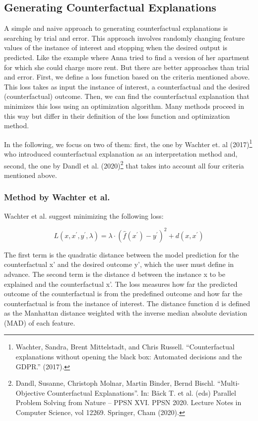 \documentclass[12pt,]{krantz}
\begin{document}
\subsection{Generating Counterfactual
Explanations}\label{generating-counterfactual-explanations}

A simple and naive approach to generating counterfactual explanations is
searching by trial and error. This approach involves randomly changing
feature values of the instance of interest and stopping when the desired
output is predicted. Like the example where Anna tried to find a version
of her apartment for which she could charge more rent. But there are
better approaches than trial and error. First, we define a loss function
based on the criteria mentioned above. This loss takes as input the
instance of interest, a counterfactual and the desired (counterfactual)
outcome. Then, we can find the counterfactual explanation that minimizes
this loss using an optimization algorithm. Many methods proceed in this
way but differ in their definition of the loss function and optimization
method.

In the following, we focus on two of them: first, the one by Wachter et.
al (2017)\footnote{Wachter, Sandra, Brent Mittelstadt, and Chris
  Russell. ``Counterfactual explanations without opening the black box:
  Automated decisions and the GDPR.'' (2017).} who introduced
counterfactual explanation as an interpretation method and, second, the
one by Dandl et al. (2020)\footnote{Dandl, Susanne, Christoph Molnar,
  Martin Binder, Bernd Bischl. ``Multi-Objective Counterfactual
  Explanations''. In: Bäck T. et al. (eds) Parallel Problem Solving from
  Nature -- PPSN XVI. PPSN 2020. Lecture Notes in Computer Science, vol
  12269. Springer, Cham (2020).} that takes into account all four
criteria mentioned above.

\subsubsection{Method by Wachter et al.}\label{method-by-wachter-et-al.}

Wachter et al. suggest minimizing the following loss:

\[L(x,x^\prime,y^\prime,\lambda)=\lambda\cdot(\hat{f}(x^\prime)-y^\prime)^2+d(x,x^\prime)\]

The first term is the quadratic distance between the model prediction
for the counterfactual x' and the desired outcome y', which the user
must define in advance. The second term is the distance d between the
instance x to be explained and the counterfactual x'. The loss measures
how far the predicted outcome of the counterfactual is from the
predefined outcome and how far the counterfactual is from the instance
of interest. The distance function d is defined as the Manhattan
distance weighted with the inverse median absolute deviation (MAD) of
each feature.
\end{document}
